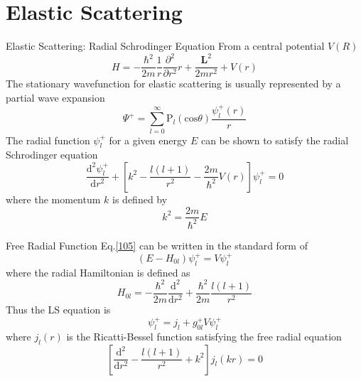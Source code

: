 \documentclass{beamer}
\begin{document}
	\section{Elastic Scattering}
	\begin{frame}{Elastic Scattering: Radial Schrodinger Equation}
		From a central potential $V(R)$
		\begin{equation}
			H=-\dfrac{\hbar^2}{2m}\dfrac{1}{r}\dfrac{\partial^2}{\partial r^2}r+\dfrac{\mathbf{L}^2}{2mr^2}+V(r)
		\end{equation}
		The stationary wavefunction for elastic scattering is usually represented by a partial wave expansion
		\begin{equation}
			\Psi^+=\sum\limits_{l=0}^\infty \mathrm{P}_l(\mathrm{cos}\theta)\dfrac{\psi_l^+(r)}{r}
		\end{equation}
		The radial function $\psi_l^+$ for a given energy $E$ can be shown to satisfy the radial Schrodinger equation
		\begin{equation}
			\dfrac{\mathrm{d}^2\psi_l^+}{\mathrm{d}r^2}+\left[ k^2-\dfrac{l(l+1)}{r^2}-\dfrac{2m}{\hbar^2}V(r)\right] \psi_l^+=0
			\label{105}
		\end{equation}
		where the momentum $k$ is defined by
		\begin{equation}
			k^2=\dfrac{2m}{\hbar^2}E
		\end{equation}
	\end{frame}
	\begin{frame}{Free Radial Function}
		Eq.\eqref{105} can be written in the standard form of
		\begin{equation}
			(E-H_{0l})\psi_l^+=V\psi_l^+
		\end{equation}
		where the radial Hamiltonian is defined as
		\begin{equation}
			H_{0l}=-\dfrac{\hbar^2}{2m}\dfrac{\mathrm{d}^2}{\mathrm{d}r^2}+\dfrac{\hbar^2}{2m}\dfrac{l(l+1)}{r^2}
		\end{equation}
		Thus the LS equation is
		\begin{equation}
			\psi_l^+=j_l+g_{0l}^+V\psi_l^+
		\end{equation}
		where $j_l(r)$ is the Ricatti-Bessel function satisfying the free radial equation
		\begin{equation}
			\left[ \dfrac{\mathrm{d}^2}{\mathrm{d}r^2}-\dfrac{l(l+1)}{r^2}+k^2 \right]j_l(kr)=0
		\end{equation}
	\end{frame}
\end{document}
